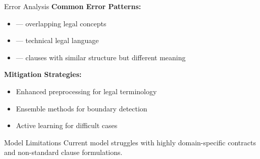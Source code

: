 \begin{frame}{Error Analysis}
\textbf{Common Error Patterns:}
\begin{itemize}
    \item {} --- overlapping legal concepts
    \item {} --- technical legal language
    \item {} --- clauses with similar structure but different meaning
\end{itemize}

\vspace{0.5cm}
\textbf{Mitigation Strategies:}
\begin{itemize}
    \item Enhanced preprocessing for legal terminology
    \item Ensemble methods for boundary detection
    \item Active learning for difficult cases
\end{itemize}

\vspace{0.5cm}
\begin{alertblock}{Model Limitations}
Current model struggles with highly domain-specific contracts and non-standard clause formulations.
\end{alertblock}
\end{frame}
